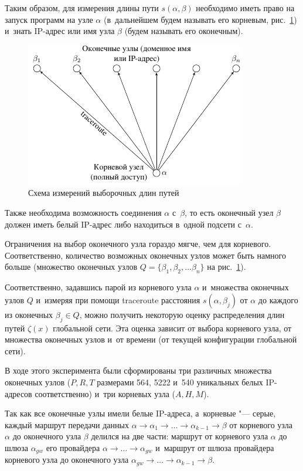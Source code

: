 \documentclass[10pt, a5paper]{article}
\begin{document}
Таким образом, для измерения длины пути $s(\alpha, \beta)$  необходимо иметь право на запуск программ на узле 
$\alpha$ (в~дальнейшем будем называть его корневым, рис.~\ref{ei_rdp}) и~знать IP-адрес или имя узла  $\beta$ (будем называть его оконечным).
\begin{figure}[h!]
  \centering
  \includegraphics[width=0.7\linewidth]{2019_miet_kai_gav_ei_rdp}
\caption{Схема измерений выборочных длин путей}
\label{ei_rdp}
\end{figure}%
Также необходима возможность соединения $\alpha$ с~$\beta$, то есть оконечный узел $\beta$ должен иметь белый IP-адрес либо находиться в~одной подсети с~$\alpha$.

Ограничения на выбор оконечного узла гораздо мягче, чем для корневого.
Соответственно, количество возможных оконечных узлов может быть намного больше (множество оконечных узлов $Q=\{\beta_1, \beta_2, \ldots \beta_n \}$ на рис.~\ref{ei_rdp}).



Соответственно, задавшись парой из корневого узла $\alpha$ и~множества оконечных узлов $Q$ и~измеряя при помощи traceroute расстояния $s(\alpha, \beta_j)$ от 
$\alpha$ до каждого из оконечных $\beta_j \in Q$, можно получить 
некоторую оценку распределения длин путей $\zeta(x)$ глобальной сети.
Эта оценка зависит от выбора корневого узла, от множества оконечных узлов и~от времени (от текущей конфигурации глобальной сети).


В ходе этого эксперимента были сформированы три различных множества оконечных узлов ($P, R, T$ размерами  564, 5222 и~540 уникальных белых IP-адресов соответственно)
и~три корневых узла ($A, H, M$).


Так как все оконечные узлы имели белые IP-адреса, а~корневые "--- серые,
каждый маршрут передачи данных $\alpha \to \alpha_1 \to \ldots \to \alpha_{k-1} \to \beta$
от корневого узла $\alpha$ до оконечного узла $\beta$ делился на две части:
 маршрут от корневого узла $\alpha$ до шлюза $\alpha_{gw}$ его провайдера $\alpha \to \ldots \to \alpha_{gw}$
и~маршрут от шлюза провайдера корневого узла до оконечного узла $\alpha_{gw}\to \ldots\to \alpha_{k-1} \to \beta$.
\end{document}
